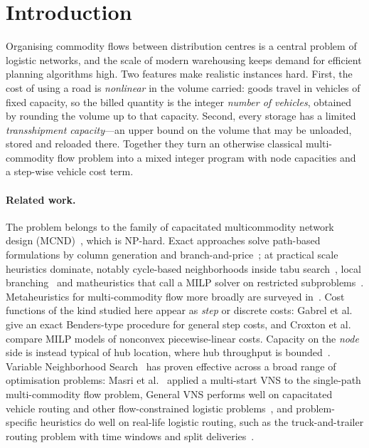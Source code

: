 \documentclass[runningheads]{llncs}
\begin{document}
\section{Introduction}

Organising commodity flows between distribution centres is a central problem of
logistic networks, and the scale of modern warehousing keeps demand for efficient
planning algorithms high. Two features make realistic instances hard. First, the
cost of using a road is \emph{nonlinear} in the volume carried: goods travel in
vehicles of fixed capacity, so the billed quantity is the integer \emph{number of
vehicles}, obtained by rounding the volume up to that capacity. Second, every
storage has a limited \emph{transshipment capacity}---an upper bound on the volume
that may be unloaded, stored and reloaded there. Together they turn an otherwise
classical multi-commodity flow problem into a mixed integer program with node
capacities and a step-wise vehicle cost term.

\paragraph{Related work.} The problem belongs to the family of capacitated
multicommodity network design (MCND)~\cite{gendron1999,crainic2000}, which is
NP-hard. Exact approaches solve path-based formulations by column generation and
branch-and-price~\cite{barnhart1998}; at practical scale heuristics dominate,
notably cycle-based neighborhoods inside tabu search~\cite{ghamlouche2003},
local branching~\cite{rodriguez2010} and matheuristics that call a MILP solver on
restricted subproblems~\cite{hewitt2010}. Metaheuristics for multi-commodity flow
more broadly are surveyed in~\cite{crainic2021}. Cost functions of the kind
studied here appear as \emph{step} or discrete costs: Gabrel et
al.~\cite{gabrel1999} give an exact Benders-type procedure for general step
costs, and Croxton et al.~\cite{croxton2003} compare MILP models of nonconvex
piecewise-linear costs. Capacity on the \emph{node} side is instead typical of
hub location, where hub throughput is bounded~\cite{alumur2008}. Variable
Neighborhood Search~\cite{mladenovic1997,hansen2019,hansen2017} has proven
effective across a broad range of optimisation problems: Masri et
al.~\cite{masri2015} applied a multi-start VNS to the single-path
multi-commodity flow problem, General VNS performs well on capacitated vehicle
routing and other flow-constrained logistic problems~\cite{amous2017}, and
problem-specific heuristics do well on real-life logistic routing, such as the
truck-and-trailer routing problem with time windows and split
deliveries~\cite{batsyn2014ttrp,batsyn2015heuristic}.
\end{document}
